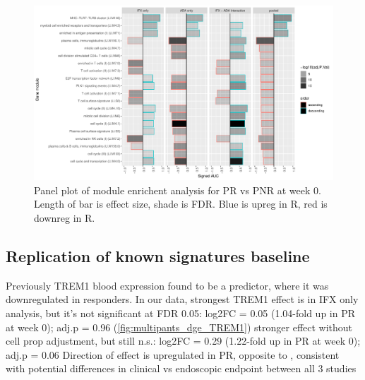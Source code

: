 \begin{outline}
\begin{figure}
    \centering
    \includegraphics[width=1.0\textwidth,page=1]{mainmatter/figures/chapter_04/plot_gene_set_enrichment.tmodCERNO_panelplot_C_1RI_1NI,C_1RA_1NA,C_(1RI_1NI)_(1RA_1NA),C_1R_1N.pdf}
    \caption{Panel plot of module enrichent analysis for PR vs PNR at week 0. Length of bar is effect size, shade is FDR. Blue is upreg in R, red is downreg in R.}
    \label{fig:multipants_dge_panelPlot_week_0_R_N}
\end{figure}

\subsection{Replication of known signatures baseline}



\1 Previously TREM1 blood expression found to be a predictor, where it was downregulated in responders.
    \2 In our data, strongest TREM1 effect is in IFX only analysis, but it’s not significant at FDR 0.05: log2FC = 0.05 (1.04-fold up in PR at week 0); adj.p = 0.96 (\autoref{fig:multipants_dge_TREM1})
        \3 stronger effect without cell prop adjustment, but still n.s.: log2FC = 0.29 (1.22-fold up in PR at week 0); adj.p = 0.06
    \2 Direction of effect is upregulated in PR, opposite to \autocite{verstockt2019LowTREM1Expression}, consistent with \autocite{gaujoux2019CellcentredMetaanalysisReveals}
    \2 potential differences in clinical vs endoscopic endpoint between all 3 studies



\end{outline}
